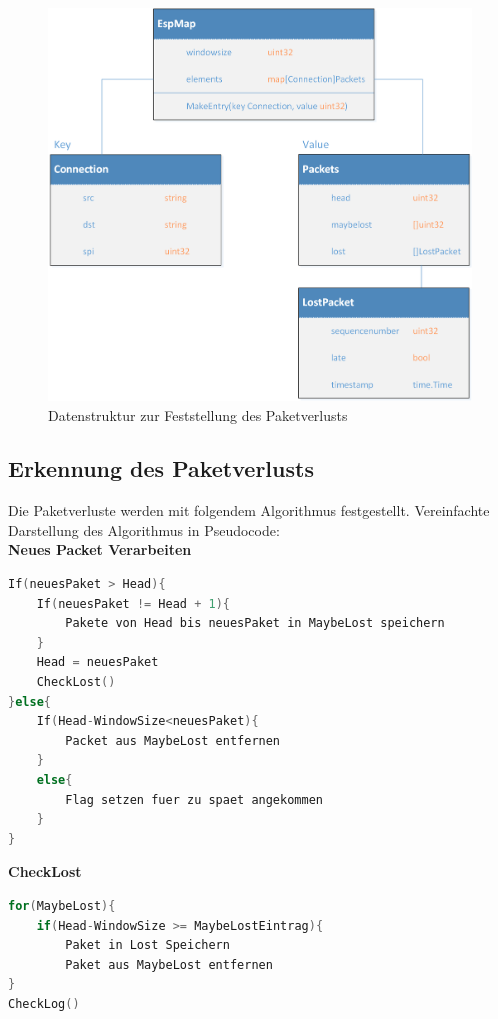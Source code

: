 \begin{figure}[H]
    \begin{center}
        \includegraphics[trim=1 0 0 0,clip,width=\textwidth]{start/img/Datenstruktur.png}
    \end{center}
    \caption{Datenstruktur zur Feststellung des Paketverlusts}
\end{figure}

\subsection{Erkennung des Paketverlusts}
Die Paketverluste werden mit folgendem Algorithmus festgestellt. 
Vereinfachte Darstellung des Algorithmus in Pseudocode:\\
\textbf{Neues Packet Verarbeiten}
\begin{lstlisting}[language=go]
If(neuesPaket > Head){
	If(neuesPaket != Head + 1){
		Pakete von Head bis neuesPaket in MaybeLost speichern
	}
	Head = neuesPaket
	CheckLost()
}else{
	If(Head-WindowSize<neuesPaket){
		Packet aus MaybeLost entfernen
	}
	else{
		Flag setzen fuer zu spaet angekommen
	}
}
\end{lstlisting}

\textbf{CheckLost}
\begin{lstlisting}[language=go]
for(MaybeLost){
	if(Head-WindowSize >= MaybeLostEintrag){
		Paket in Lost Speichern
		Paket aus MaybeLost entfernen
}
CheckLog()
\end{lstlisting}

